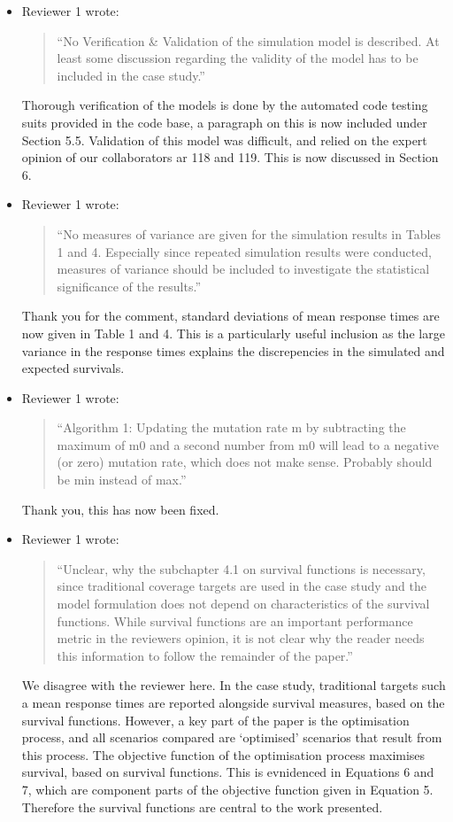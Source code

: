 \documentclass{article}
\begin{document}
\begin{itemize}

\item Reviewer 1 wrote:
\begin{quote}
``No Verification \& Validation of the simulation model is described. At least some discussion regarding the validity of the model has to be included in the case study.''
\end{quote}
Thorough verification of the models is done by the automated code testing suits provided in the code base, a paragraph on this is now included under Section 5.5. Validation of this model was difficult, and relied on the expert opinion of our collaborators ar 118 and 119. This is now discussed in Section 6.

\item Reviewer 1 wrote:
\begin{quote}
``No measures of variance are given for the simulation results in Tables 1 and 4. Especially since repeated simulation results were conducted, measures of variance should be included to investigate the statistical significance of the results.''
\end{quote}
Thank you for the comment, standard deviations of mean response times are now given in Table 1 and 4. This is a particularly useful inclusion as the large variance in the response times explains the discrepencies in the simulated and expected survivals.

\item Reviewer 1 wrote:
\begin{quote}
``Algorithm 1: Updating the mutation rate m by subtracting the maximum of m0 and a second number from m0 will lead to a negative (or zero) mutation rate, which does not make sense. Probably should be min instead of max.''
\end{quote}
Thank you, this has now been fixed.

\item Reviewer 1 wrote:
\begin{quote}
``Unclear, why the subchapter 4.1 on survival functions is necessary, since traditional coverage targets are used in the case study and the model formulation does not depend on characteristics of the survival functions. While survival functions are an important performance metric in the reviewers opinion, it is not clear why the reader needs this information to follow the remainder of the paper.''
\end{quote}
We disagree with the reviewer here. In the case study, traditional targets such a mean response times are reported alongside survival measures, based on the survival functions. However, a key part of the paper is the optimisation process, and all scenarios compared are `optimised' scenarios that result from this process. The objective function of the optimisation process maximises survival, based on survival functions. This is evnidenced in Equations 6 and 7, which are component parts of the objective function given in Equation 5. Therefore the survival functions are central to the work presented.


\end{itemize}
\end{document}
